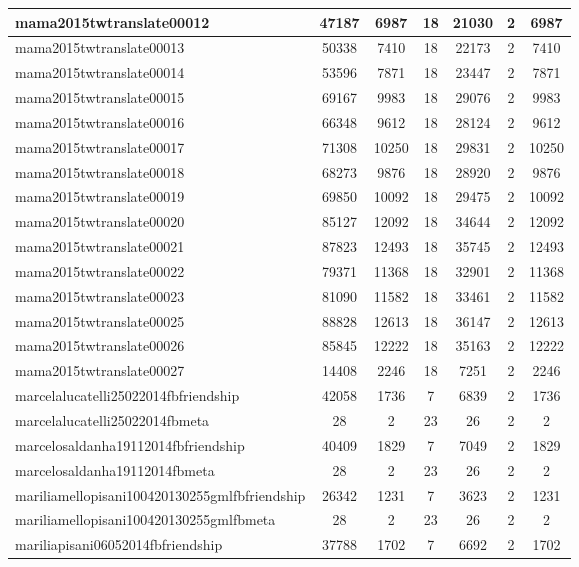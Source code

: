\begin{table*}[h!]
\begin{center}
\begin{tabular}{| l | c | c | c | c | c | c |}
mama2015twtranslate00012 & 47187  & 6987  & 18  & 21030  & 2  & 6987 \\\hline
mama2015twtranslate00013 & 50338  & 7410  & 18  & 22173  & 2  & 7410 \\\hline
mama2015twtranslate00014 & 53596  & 7871  & 18  & 23447  & 2  & 7871 \\\hline
mama2015twtranslate00015 & 69167  & 9983  & 18  & 29076  & 2  & 9983 \\\hline
mama2015twtranslate00016 & 66348  & 9612  & 18  & 28124  & 2  & 9612 \\\hline
mama2015twtranslate00017 & 71308  & 10250  & 18  & 29831  & 2  & 10250 \\\hline
mama2015twtranslate00018 & 68273  & 9876  & 18  & 28920  & 2  & 9876 \\\hline
mama2015twtranslate00019 & 69850  & 10092  & 18  & 29475  & 2  & 10092 \\\hline
mama2015twtranslate00020 & 85127  & 12092  & 18  & 34644  & 2  & 12092 \\\hline
mama2015twtranslate00021 & 87823  & 12493  & 18  & 35745  & 2  & 12493 \\\hline
mama2015twtranslate00022 & 79371  & 11368  & 18  & 32901  & 2  & 11368 \\\hline
mama2015twtranslate00023 & 81090  & 11582  & 18  & 33461  & 2  & 11582 \\\hline
mama2015twtranslate00025 & 88828  & 12613  & 18  & 36147  & 2  & 12613 \\\hline
mama2015twtranslate00026 & 85845  & 12222  & 18  & 35163  & 2  & 12222 \\\hline
mama2015twtranslate00027 & 14408  & 2246  & 18  & 7251  & 2  & 2246 \\\hline
marcelalucatelli25022014fbfriendship & 42058  & 1736  & 7  & 6839  & 2  & 1736 \\\hline
marcelalucatelli25022014fbmeta & 28  & 2  & 23  & 26  & 2  & 2 \\\hline
marcelosaldanha19112014fbfriendship & 40409  & 1829  & 7  & 7049  & 2  & 1829 \\\hline
marcelosaldanha19112014fbmeta & 28  & 2  & 23  & 26  & 2  & 2 \\\hline
mariliamellopisani100420130255gmlfbfriendship & 26342  & 1231  & 7  & 3623  & 2  & 1231 \\\hline
mariliamellopisani100420130255gmlfbmeta & 28  & 2  & 23  & 26  & 2  & 2 \\\hline
mariliapisani06052014fbfriendship & 37788  & 1702  & 7  & 6692  & 2  & 1702 \\\hline

\end{tabular}
\end{center}
\end{table*}
